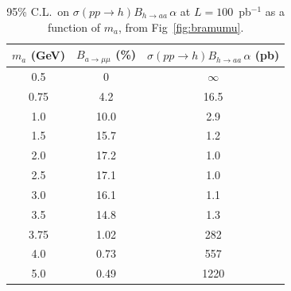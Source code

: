 \documentclass[aps,12pt,superscriptaddress,nofootinbib,floatfix,showpacs]{revtex4}
\begin{document}
\begin{table}[htb]
\caption{95\% C.L.\ on $\sigma(pp \to h) B_{h \to aa} \, \alpha$ at $L = 100$~pb$^{-1}$ as a function of $m_a$, from Fig~\ref{fig:bramumu}. \label{table_bramumu_factorized}}
\begin{center}
\renewcommand{\arraystretch}{1.1}
\begin{tabular}{| c | c | c |}
\hline
\mbox{\hspace{0.25 cm}}$m_a$ (GeV)\mbox{\hspace{0.25 cm}} & \mbox{\hspace{0.25 cm}}$B_{a \to \mu\mu}$ (\%)\mbox{\hspace{0.25 cm}} & \mbox{\hspace{0.25 cm}}$\sigma(pp \to h) B_{h \to aa} \, \alpha$ (pb)\mbox{\hspace{0.25 cm}} \\\hline
0.5 & 0 & $\infty$ \\
0.75 & 4.2 & 16.5 \\
1.0 & 10.0 & 2.9 \\
1.5 & 15.7 & 1.2 \\
2.0 & 17.2 & 1.0 \\
2.5 & 17.1 & 1.0 \\
3.0 & 16.1 & 1.1 \\
3.5 & 14.8 & 1.3 \\
3.75 & 1.02 & 282 \\
4.0 & 0.73 & 557 \\
5.0 & 0.49 & 1220 \\\hline
\end{tabular}
\end{center}
\end{table}
\end{document}
